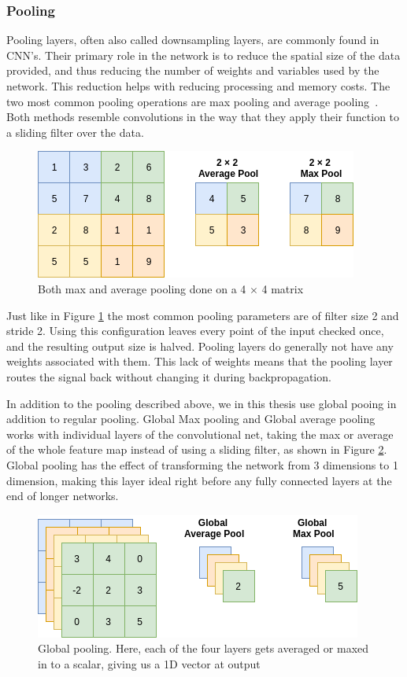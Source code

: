 \subsubsection{Pooling}
\label{cha:pool}
Pooling layers, often also called downsampling layers, are commonly found in CNN's. 
Their primary role in the network is to reduce the spatial size of the data provided, and thus reducing the number of weights and variables used by the network. This reduction helps with reducing processing and memory costs.  
The two most common pooling operations are max pooling and average pooling~\cite{zhou1988computation}. Both methods resemble convolutions in the way that they apply their function to a sliding filter over the data. 
 
\begin{figure}
        \centering
        \includegraphics[scale=0.7]{background/figures/pooling.png}
        \caption{Both max and average pooling done on a 4 $\times$ 4 matrix}
        \label{fig:pooling}
\end{figure}

Just like in Figure \ref{fig:pooling} the most common pooling parameters are of filter size 2 and stride 2. Using this configuration leaves every point of the input checked once, and the resulting output size is halved. 
Pooling layers do generally not have any weights associated with them. This lack of weights means that the pooling layer routes the signal back without changing it during backpropagation.

In addition to the pooling described above, we in this thesis use global pooing in addition to regular pooling. Global Max pooling and Global average pooling works with individual layers of the convolutional net, taking the max or average of the whole feature map instead of using a sliding filter, as shown in Figure \ref{fig:GAP}.
Global pooling has the effect of transforming the network from 3 dimensions to 1 dimension, making this layer ideal right before any fully connected layers at the end of longer networks.

\begin{figure}
        \centering
        \includegraphics[scale=0.7]{background/figures/GAP.png}
        \caption{Global pooling. Here, each of the four layers gets averaged or maxed in to a scalar, giving us a 1D vector at output}
        \label{fig:GAP}
\end{figure}

